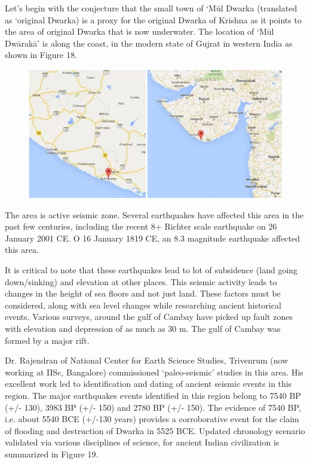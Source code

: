 Let’s begin with the conjecture that the small town of ‘Mūl Dwarka (translated as ‘original Dwarka) is a proxy for the original Dwarka of Krishna as it points to the area of original Dwarka that is now underwater. The location of ‘Mūl Dwārakā’ is along the coast, in the modern state of Gujrat in western India as shown in Figure 18.

\begin{figure}[!htbp]
\includegraphics[scale=0.4]{images/8-18.jpg}
\caption{}\label{art8-fig18}
\end{figure}

The area is active seismic zone. Several earthquakes have affected this area in the past few centuries, including the recent 8+ Richter scale earthquake on 26 January 2001 CE. O 16 January 1819 CE, an 8.3 magnitude earthquake affected this area.

It is critical to note that these earthquakes lead to lot of subsidence (land going down/sinking) and elevation at other places. This seismic activity leads to changes in the height of sea floors and not just land. These factors must be considered, along with sea level changes while researching ancient historical events. Various surveys, around the gulf of Cambay have picked up fault zones with elevation and depression of as much as 30 m. The gulf of Cambay was formed by a major rift.

Dr. Rajendran of National Center for Earth Science Studies, Trivenrum (now working at IISc, Bangalore) commissioned ‘paleo-seismic’ studies in this area. His excellent work led to identification and dating of ancient seismic events in this region. The major earthquakes events identified in this region belong to 7540 BP (+/- 130), 3983 BP (+/- 150) and 2780 BP (+/- 150). The evidence of 7540 BP, i.e. about 5540 BCE (+/-130 years) provides a corroborative event for the claim of flooding and destruction of Dwarka in 5525 BCE. Updated chronology scenario validated via various disciplines of science, for ancient Indian civilization is summarized in Figure 19.

